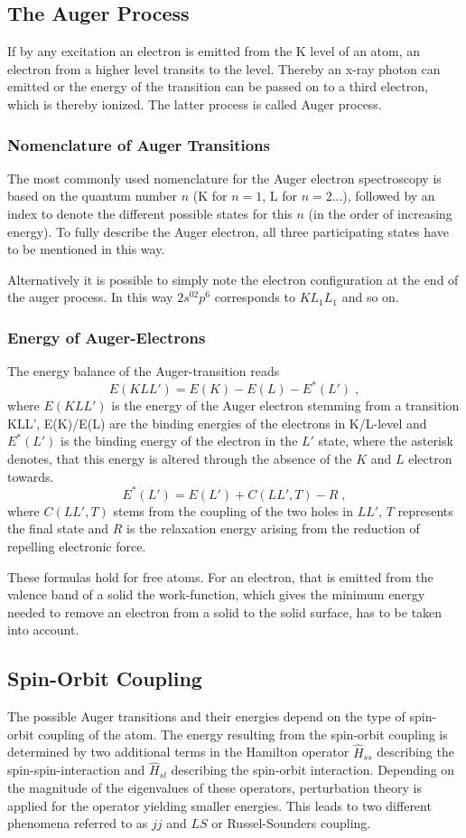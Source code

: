 \documentclass[a4paper]{scrartcl}
\numberwithin{equation}{section}
\numberwithin{figure}{section}
\numberwithin{table}{section}
\newcommand{\eq}[2]{\begin{equation}#1\label{#2}\end{equation}}
\begin{document}
\subsection{The Auger Process}
If by any excitation an electron is emitted from the K level of an atom, an electron from a higher level transits to the level. Thereby an x-ray photon can emitted or the energy of the transition can be passed on to a third electron, which is thereby ionized. The latter process is called Auger process.


\subsubsection*{Nomenclature of Auger Transitions}
The most commonly used nomenclature for the Auger electron spectroscopy is based on the quantum number $n$ (K for $n=1$, L for $n=2$...), followed by an index to denote the different possible states for this $n$ (in the order of increasing energy). To fully describe the Auger electron, all three participating states have to be mentioned in this way. 

Alternatively it is possible to simply note the electron configuration at the end of the auger process. In this way $2s^02p^6$ corresponds to $KL_1L_1$ and so on.




\subsubsection*{Energy of Auger-Electrons}
The energy balance of the Auger-transition reads
\eq{E(KLL') = E(K) -E(L) - E^{*}(L') \; ,}{EKLL}
where $E(KLL')$ is the energy of the Auger electron stemming from a transition KLL', E(K)/E(L) are the binding energies of the electrons in K/L-level and $E^*(L')$ is the binding energy of the electron in the $L'$ state, where the asterisk denotes, that this energy is altered through the absence of the $K$ and $L$ electron towards.
\eq{E^*(L') = E(L') + C(LL',T) -R \; ,}{E*}
where $C(LL',T)$ stems from the coupling of the two holes in $LL'$, $T$ represents the final state and $R$ is the relaxation energy arising from the reduction of repelling electronic force. 

These formulas hold for free atoms. For an electron, that is emitted from the valence band of a solid the work-function, which gives the minimum energy needed to remove an electron from a solid to the solid surface, has to be taken into account.

\subsection{Spin-Orbit Coupling}
The possible Auger transitions and their energies depend on the type of spin-orbit coupling of the atom. The energy resulting from the spin-orbit coupling is determined by two additional terms in the Hamilton operator $\hat H_{ss}$ describing the spin-spin-interaction and $\hat H_{sl}$ describing the spin-orbit interaction. Depending on the magnitude of the eigenvalues of these operators, perturbation theory is applied for the operator yielding smaller energies. This leads to two different phenomena referred to as $jj$ and $LS$ or Russel-Sounders coupling.
\end{document}
